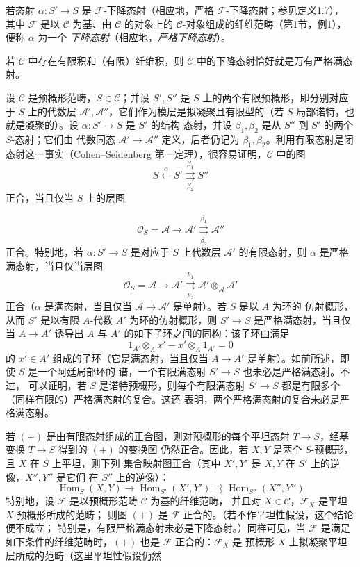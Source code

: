  若态射 $\alpha:S'\longrightarrow S$ 是
$\mathcal F$-下降态射（相应地，严格 $\mathcal F$-下降态射；参见定义1.7），
其中 $\mathcal F$ 是以 $\mathcal C$ 为基、由 $\mathcal C$ 的对象上的
$\mathcal C$-对象组成的纤维范畴（第1节，例1），便称 $\alpha$ 为一个
\emph{下降态射}（相应地，\emph{严格下降态射}）。

 若 $\mathcal C$ 中存在有限积和（有限）纤维积，则
$\mathcal C$ 中的下降态射恰好就是万有严格满态射。

 设 $\mathcal C$ 是预概形范畴，$S\in\mathcal C$；并设
$S',S''$ 是 $S$ 上的两个有限预概形，即分别对应于 $S$ 上的代数层
$\mathcal A',\mathcal A''$，它们作为模层是拟凝聚且有限型的（若 $S$
局部诺特，也就是凝聚的）。设 $\alpha:S'\longrightarrow S$ 是 $S'$ 的结构
态射，并设 $\beta_1,\beta_2$ 是从 $S''$ 到 $S'$ 的两个 $S$-态射；它们由
代数同态 $\mathcal A'\longrightarrow\mathcal A''$ 定义，后者仍记为
$\beta_1,\beta_2$。利用有限态射是闭态射这一事实（Cohen--Seidenberg
第一定理），很容易证明，$\mathcal C$ 中的图
\[
  \tag{+}
  S\xleftarrow{\alpha}S'
  \overset{\beta_1}{\underset{\beta_2}{\rightrightarrows}}S''
\]
正合，当且仅当 $S$ 上的层图

\[
  \mathcal O_S=\mathcal A\longrightarrow\mathcal A'
  \overset{\beta_1}{\underset{\beta_2}{\rightrightarrows}}\mathcal A''
\]
正合。特别地，若 $\alpha:S'\longrightarrow S$ 是对应于 $S$ 上代数层
$\mathcal A'$ 的有限态射，则 $\alpha$ 是严格满态射，当且仅当层图
\[
  \mathcal O_S=\mathcal A\longrightarrow\mathcal A'
  \overset{p_1}{\underset{p_2}{\rightrightarrows}}
  \mathcal A'\otimes_{\mathcal A}\mathcal A'
\]
正合（$\alpha$ 是满态射，当且仅当
$\mathcal A\longrightarrow\mathcal A'$ 是单射）。若 $S$ 是以 $A$ 为环的
仿射概形，从而 $S'$ 是以有限 $A$-代数 $A'$ 为环的仿射概形，则
$S'\longrightarrow S$ 是严格满态射，当且仅当 $A\longrightarrow A'$
诱导出 $A$ 与 $A'$ 的如下子环之间的同构：该子环由满足
\[
  1_{A'}\otimes_Ax'-x'\otimes_A1_{A'}=0
\]
的 $x'\in A'$ 组成的子环（它是满态射，当且仅当
$A\longrightarrow A'$ 是单射）。如前所述，即使 $S$ 是一个阿廷局部环的
谱，一个有限满态射 $S'\longrightarrow S$ 也未必是严格满态射。不过，
可以证明，若 $S$ 是诺特预概形，则每个有限满态射
$S'\longrightarrow S$ 都是有限多个（同样有限的）严格满态射的复合。这还
表明，两个严格满态射的复合未必是严格满态射。

 若 $(+)$ 是由有限态射组成的正合图，则对预概形的每个平坦态射
$T\longrightarrow S$，经基变换 $T\longrightarrow S$ 得到的 $(+)$ 的变换图
仍然正合。因此，若 $X,Y$ 是两个 $S$-预概形，且 $X$ 在 $S$ 上平坦，则下列
集合映射图正合（其中 $X',Y'$ 是 $X,Y$ 在 $S'$ 上的逆像，$X'',Y''$ 是它们
在 $S''$ 上的逆像）：
\[
  \operatorname{Hom}_S(X,Y)\longrightarrow
  \operatorname{Hom}_{S'}(X',Y')
  \rightrightarrows
  \operatorname{Hom}_{S''}(X'',Y'')
\]
特别地，设 $\mathcal F$ 是以预概形范畴 $\mathcal C$ 为基的纤维范畴，
并且对 $X\in\mathcal C$，$\mathcal F_X$ 是平坦 $X$-预概形所成的范畴；
则图 $(+)$ 是 $\mathcal F$-正合的。（若不作平坦性假设，这个结论便不成立；
特别是，有限严格满态射未必是下降态射。）同样可见，当 $\mathcal F$ 是满足
如下条件的纤维范畴时，$(+)$ 也是 $\mathcal F$-正合的：$\mathcal F_X$ 是
预概形 $X$ 上拟凝聚平坦层所成的范畴（这里平坦性假设仍然

